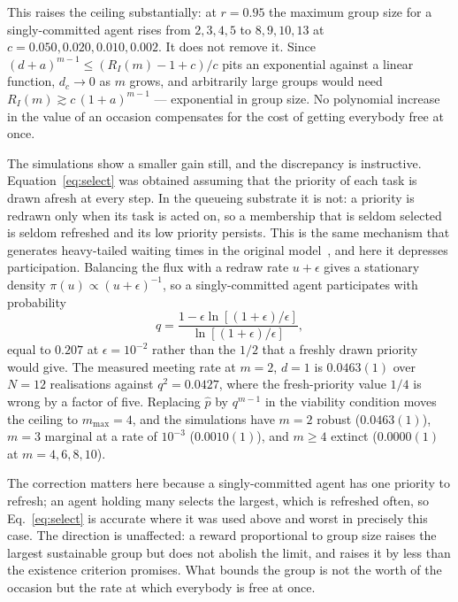 \documentclass[aps,pre,twocolumn,superscriptaddress,floatfix,longbibliography]{revtex4-2}
\begin{document}
This raises the ceiling substantially: at $r=0.95$ the maximum group size for a
singly-committed agent rises from $2,3,4,5$ to $8,9,10,13$ at
$c=0.050,0.020,0.010,0.002$. It does not remove it. Since
$(d+a)^{m-1}\le(R_I(m)-1+c)/c$ pits an exponential against a linear function,
$d_c\to0$ as $m$ grows, and arbitrarily large groups would need
$R_I(m)\gtrsim c\,(1+a)^{m-1}$ --- exponential in group size. No polynomial
increase in the value of an occasion compensates for the cost of getting
everybody free at once.

The simulations show a smaller gain still, and the discrepancy is instructive.
Equation~\eqref{eq:select} was obtained assuming that the priority of each task
is drawn afresh at every step. In the queueing substrate it is not: a priority
is redrawn only when its task is acted on, so a membership that is seldom
selected is seldom refreshed and its low priority persists. This is the same
mechanism that generates heavy-tailed waiting times in the original
model~\cite{barabasi2005,oliveira2009}, and here it depresses participation.
Balancing the flux with a redraw rate $u+\epsilon$ gives a stationary density
$\pi(u)\propto(u+\epsilon)^{-1}$, so a singly-committed agent participates with
probability
\begin{equation}
  q=\frac{1-\epsilon\ln\!\left[(1+\epsilon)/\epsilon\right]}
         {\ln\!\left[(1+\epsilon)/\epsilon\right]} ,
  \label{eq:qstat}
\end{equation}
equal to $0.207$ at $\epsilon=10^{-2}$ rather than the $1/2$ that a freshly
drawn priority would give. The measured meeting rate at $m=2$, $d=1$ is
$0.0463(1)$ over $N=12$ realisations
against $q^2=0.0427$, where the fresh-priority value $1/4$ is wrong by a factor
of five. Replacing $\hat p$ by $q^{m-1}$ in the viability condition moves the
ceiling to $m_{\max}=4$, and the simulations have $m=2$ robust
($0.0463(1)$), $m=3$ marginal
at a rate of $10^{-3}$ ($0.0010(1)$), and $m\ge4$ extinct
($0.0000(1)$ at $m=4,6,8,10$).

The correction matters here because a singly-committed agent has one priority to
refresh; an agent holding many selects the largest, which is refreshed often, so
Eq.~\eqref{eq:select} is accurate where it was used above and worst in precisely
this case. The direction is unaffected: a reward proportional to group size
raises the largest sustainable group but does not abolish the limit, and raises
it by less than the existence criterion promises. What bounds the group is not
the worth of the occasion but the rate at which everybody is free at once.
\end{document}
